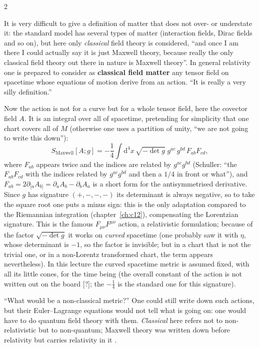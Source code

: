 \begin{paracol}{2}
\begin{definition}\label{def:c14-field}
It is very difficult to give a definition of matter that does not over- or understate it: the standard model has several types of matter (interaction fields, Dirac fields and so on), but here only \emph{classical} field theory is considered, ``and once I am there I could actually say it is just Maxwell theory, because really the only classical field theory out there in nature is Maxwell theory''. In general relativity one is prepared to consider as \textbf{classical field matter} any tensor field on spacetime whose equations of motion derive from an action. ``It is really a very silly definition.''
\end{definition}
\begin{example}\label{ex:c14-maxwell}
Now the action is not for a curve but for a whole tensor field, here the covector field $A$. It is an integral over all of spacetime, pretending for simplicity that one chart covers all of $M$ (otherwise one uses a partition of unity, ``we are not going to write this down''):
\[
  S_{\mathrm{Maxwell}}[A;g]=-\frac14\int\mathrm d^4x\,\sqrt{-\det g}\;g^{ac}\,g^{bd}\,F_{ab}F_{cd},
\]
where $F_{ab}$ appears twice and the indices are related by $g^{ac}g^{bd}$ (Schuller: ``the $F_{ab}F_{cd}$ with the indices related by $g^{ac}g^{bd}$ and then a $1/4$ in front or what''), and $F_{ab}=2\partial_{[a}A_{b]}=\partial_aA_b-\partial_bA_a$ is a short form for the antisymmetrised derivative. Since $g$ has signature $(+,-,-,-)$ its determinant is always negative, so to take the square root one puts a minus sign: this is the only adaptation compared to the Riemannian integration (chapter~\ref{ch:c12}), compensating the Lorentzian signature. This is the famous $F_{\mu\nu}F^{\mu\nu}$ action, a relativistic formulation; because of the factor $\sqrt{-\det g}$ it works on \emph{curved} spacetime (one probably saw it with $\eta$, whose determinant is $-1$, so the factor is invisible; but in a chart that is not the trivial one, or in a non-Lorentz transformed chart, the term appears nevertheless). In this lecture the curved spacetime metric is assumed fixed, with all its little cones, for the time being (the overall constant of the action is not written out on the board [?]; the $-\tfrac14$ is the standard one for this signature).
\end{example}
\begin{coursenote}
``What would be a non-classical metric?'' One could still write down such actions, but their Euler--Lagrange equations would not tell what is going on: one would have to do quantum field theory with them. \emph{Classical} here refers not to non-relativistic but to non-quantum; Maxwell theory was written down before relativity but carries relativity in it .
\end{coursenote}


\end{paracol}
